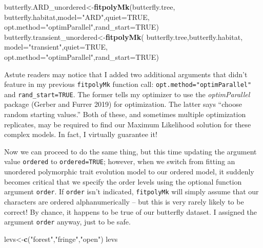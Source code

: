 \documentclass[fleqn,10pt,lineno]{wlpeerj} %
\newenvironment{Shaded}{\begin{snugshade}}{\end{snugshade}}
\newcommand{\AttributeTok}[1]{\textcolor[rgb]{0.13,0.29,0.53}{#1}}
\newcommand{\ConstantTok}[1]{\textcolor[rgb]{0.56,0.35,0.01}{#1}}
\newcommand{\FunctionTok}[1]{\textcolor[rgb]{0.13,0.29,0.53}{\textbf{#1}}}
\newcommand{\NormalTok}[1]{#1}
\newcommand{\OtherTok}[1]{\textcolor[rgb]{0.56,0.35,0.01}{#1}}
\newcommand{\StringTok}[1]{\textcolor[rgb]{0.31,0.60,0.02}{#1}}
\begin{document}
\begin{Shaded}
\begin{Highlighting}[]
\NormalTok{butterfly.ARD\_unordered}\OtherTok{\textless{}{-}}\FunctionTok{fitpolyMk}\NormalTok{(butterfly.tree,}
\NormalTok{  butterfly.habitat,}\AttributeTok{model=}\StringTok{"ARD"}\NormalTok{,}\AttributeTok{quiet=}\ConstantTok{TRUE}\NormalTok{,}
  \AttributeTok{opt.method=}\StringTok{"optimParallel"}\NormalTok{,}\AttributeTok{rand\_start=}\ConstantTok{TRUE}\NormalTok{)}
\NormalTok{butterfly.transient\_unordered}\OtherTok{\textless{}{-}}\FunctionTok{fitpolyMk}\NormalTok{(}
\NormalTok{  butterfly.tree,butterfly.habitat,}
  \AttributeTok{model=}\StringTok{"transient"}\NormalTok{,}\AttributeTok{quiet=}\ConstantTok{TRUE}\NormalTok{,}
  \AttributeTok{opt.method=}\StringTok{"optimParallel"}\NormalTok{,}\AttributeTok{rand\_start=}\ConstantTok{TRUE}\NormalTok{)}
\end{Highlighting}
\end{Shaded}

Astute readers may notice that I added two additional arguments that didn't feature in my previous \texttt{fitpolyMk} function call: \texttt{opt.method="optimParallel"} and \texttt{rand\_start=TRUE}. The former tells my optimizer to use the \emph{optimParallel} package (Gerber and Furrer 2019) for optimization. The latter says ``choose random starting values.'' Both of these, and sometimes multiple optimization replicates, may be required to find our Maximum Likelihood solution for these complex models. In fact, I virtually guarantee it!

Now we can proceed to do the same thing, but this time updating the argument value \texttt{ordered} to \texttt{ordered=TRUE}; however, when we switch from fitting an unordered polymorphic trait evolution model to our ordered model, it suddenly becomes critical that we specify the order levels using the optional function argument \texttt{order}. If \texttt{order} isn't indicated, \texttt{fitpolyMk} will simply assume that our characters are ordered alphanumerically -- but this is very rarely likely to be correct! By chance, it happens to be true of our butterfly dataset. I assigned the argument \texttt{order} anyway, just to be safe.

\begin{Shaded}
\begin{Highlighting}[]
\NormalTok{levs}\OtherTok{\textless{}{-}}\FunctionTok{c}\NormalTok{(}\StringTok{"forest"}\NormalTok{,}\StringTok{"fringe"}\NormalTok{,}\StringTok{"open"}\NormalTok{)}
\NormalTok{levs}
\end{Highlighting}
\end{Shaded}
\end{document}
